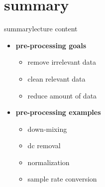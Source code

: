     \section{summary}
        \begin{frame}{summary}{lecture content}
            \begin{itemize}
                \item   \textbf{pre-processing goals}
                    \begin{itemize}
                        \item   remove irrelevant data
                        \item   clean relevant data
                        \item   reduce amount of data
                    \end{itemize}
                \bigskip
                \item   \textbf{pre-processing examples}
                    \begin{itemize}
                        \item   down-mixing
                        \item   dc removal
                        \item   normalization
                        \item   sample rate conversion
                    \end{itemize}
            \end{itemize}
        \end{frame}

